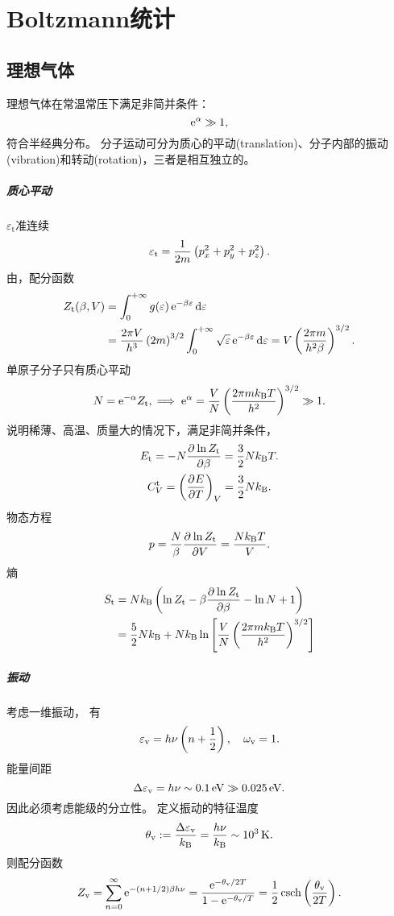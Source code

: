 \newcommand*{\tl}{\mathrm t}  %
\newcommand*{\rt}{\mathrm r}  %
\newcommand*{\vb}{\mathrm v}  %

\chapter{Boltzmann统计}

\section{理想气体}
理想气体在常温常压下满足非简并条件：
\[
	\mathop{}\!\mathrm{e}^\alpha\gg 1,
\]
符合半经典分布。%
分子运动可分为质心的平动(translation)、分子内部的振动(vibration)和转动(rotation)，三者是相互独立的。
\paragraph{质心平动}
$\varepsilon_\tl$准连续
\[
	\varepsilon_\tl=\frac1{2m}\kh{p_x^2+p_y^2+p_z^2}.
\]
由，配分函数
\begin{align}\notag
	Z_\tl(\beta,V) & =\int\zti g(\varepsilon)\e{-\beta\varepsilon}\d\varepsilon                                                                      \\
	               & =\frac{2\pi V}{h^3}\kh{2m}^{3/2}\int\zti\sqrt\varepsilon\e{-\beta\varepsilon}\d\varepsilon=V\kh{\frac{2\pi m}{h^2\beta}}^{3/2}.
\end{align}
单原子分子只有质心平动
\[
	N=\e{-\alpha}Z_\tl,\implies\e{\alpha}=\frac VN\kh{\frac{2\pi m\kB T}{h^2}}^{3/2}\gg 1.
\]
说明稀薄、高温、质量大的情况下，满足非简并条件，
\begin{gather}
	E_\tl=-N\pv{\ln Z_\tl}\beta=\frac32N\kB T.\\
	C_V^\tl=\kh{\pv ET}_V=\frac32N\kB.
\end{gather}
物态方程
\begin{align}
	p=\frac N\beta\pv{\ln Z_\tl}V=\frac{N\kB T}V.
\end{align}
熵
\begin{align}\notag
	S_\tl & =N\kB\kh{\ln Z_\tl-\beta\pv{\ln Z_\tl}\beta-\ln N+1}                 \\
	      & =\frac52N\kB+N\kB\ln\fkh{\frac VN\kh{\frac{2\pi m\kB T}{h^2}}^{3/2}}
\end{align}
\paragraph{振动}
考虑一维振动，%
有
\[
	\varepsilon_\vb=h\nu\kh{n+\frac12},\quad\omega_\vb=1.
\]
能量间距
\[
	\D\varepsilon_\vb=h\nu\sim\SI{0.1}\electronvolt\gg\SI{0.025}\electronvolt.
\]
因此必须考虑能级的分立性。
定义振动的特征温度
\[
	\theta_\vb:=\frac{\D\varepsilon_\vb}\kB=\frac{h\nu}\kB\sim\SI{e3}\K.
\]
则配分函数
\begin{align}
	Z_\vb=\sum_{n=0}^\infty\e{-(n+1/2)\beta h\nu}=\frac{\e{-\theta_\vb/2T}}{1-\e{-\theta_\vb/T}}=\frac12\csch\kh{\frac{\theta_\vb}{2T}}.
\end{align}

